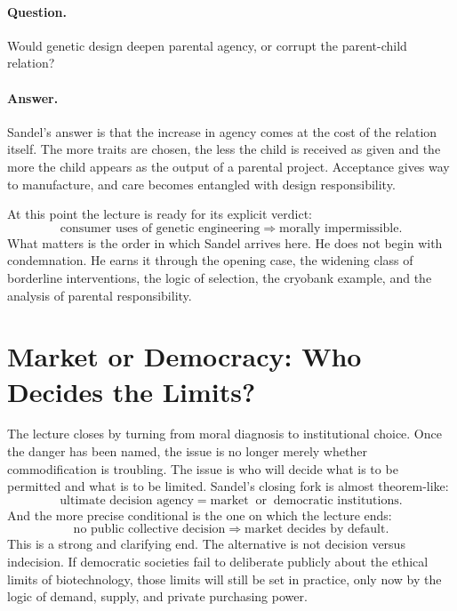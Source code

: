\paragraph{Question.} Would genetic design deepen parental agency, or corrupt the parent-child relation?

\paragraph{Answer.} Sandel's answer is that the increase in agency comes at the cost of the relation itself. The more traits are chosen, the less the child is received as given and the more the child appears as the output of a parental project. Acceptance gives way to manufacture, and care becomes entangled with design responsibility.

At this point the lecture is ready for its explicit verdict:
\begin{equation}
\text{consumer uses of genetic engineering}
\Longrightarrow
\text{morally impermissible}.
\end{equation}
What matters is the order in which Sandel arrives here. He does not begin with condemnation. He earns it through the opening case, the widening class of borderline interventions, the logic of selection, the cryobank example, and the analysis of parental responsibility.

\section{Market or Democracy: Who Decides the Limits?}

The lecture closes by turning from moral diagnosis to institutional choice. Once the danger has been named, the issue is no longer merely whether commodification is troubling. The issue is who will decide what is to be permitted and what is to be limited. Sandel's closing fork is almost theorem-like:
\begin{equation}
\text{ultimate decision agency}
=
\text{market}
\;\;\text{or}\;\;
\text{democratic institutions}.
\end{equation}
And the more precise conditional is the one on which the lecture ends:
\begin{equation}
\text{no public collective decision}
\Longrightarrow
\text{market decides by default}.
\end{equation}
This is a strong and clarifying end. The alternative is not decision versus indecision. If democratic societies fail to deliberate publicly about the ethical limits of biotechnology, those limits will still be set in practice, only now by the logic of demand, supply, and private purchasing power.

